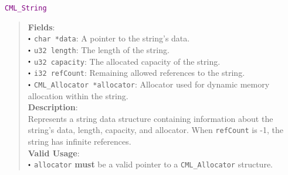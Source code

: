 \documentclass[a4paper,oneside,8pt]{extarticle}
\newcommand{\struct}[1]{
  \noindent\textcolor{purple}{\texttt{#1}}
  \vspace{-0.3em}
}
\renewcommand{\dot}{\raisebox{0.3ex}{\scalebox{0.6}{$\bullet$}}}
\theoremstyle{definition}
\begin{document}
\struct{CML\_String}
\begin{quote}
  \textbf{Fields}: \\
  $\dot$ \texttt{char *data}: A pointer to the string's data. \\
  $\dot$ \texttt{u32 length}: The length of the string. \\
  $\dot$ \texttt{u32 capacity}: The allocated capacity of the string. \\
  $\dot$ \texttt{i32 refCount}: Remaining allowed references to the string. \\
  $\dot$ \texttt{CML\_Allocator *allocator}: Allocator used for dynamic memory allocation within the string. \\
  
  \vspace{-0.75em}
  \textbf{Description}: \\
  Represents a string data structure containing information about the string's data, length, capacity, and allocator. When \texttt{refCount} is -1, the string has infinite references. \\

  \vspace{-0.75em}
  \textbf{Valid Usage}: \\
  $\dot$ \texttt{allocator} \textbf{must} be a valid pointer to a \texttt{CML\_Allocator} structure. \\
\end{quote}
\end{document}
